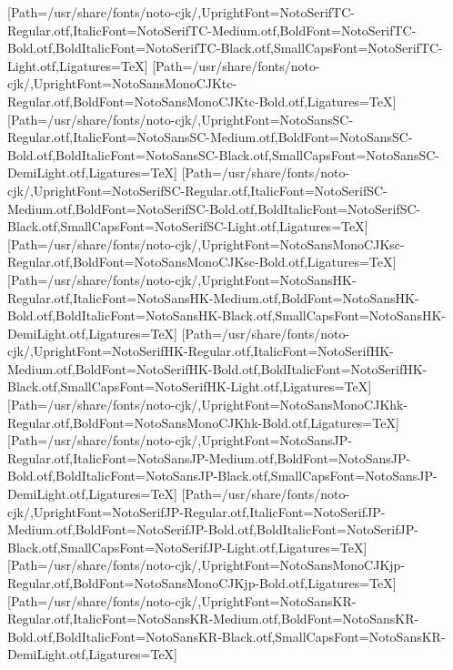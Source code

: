 \newfontfamily{}[Path=/usr/share/fonts/noto-cjk/,UprightFont=NotoSerifTC-Regular.otf,ItalicFont=NotoSerifTC-Medium.otf,BoldFont=NotoSerifTC-Bold.otf,BoldItalicFont=NotoSerifTC-Black.otf,SmallCapsFont=NotoSerifTC-Light.otf,Ligatures=TeX]
\newfontfamily{}[Path=/usr/share/fonts/noto-cjk/,UprightFont=NotoSansMonoCJKtc-Regular.otf,BoldFont=NotoSansMonoCJKtc-Bold.otf,Ligatures=TeX]
\newfontfamily{}[Path=/usr/share/fonts/noto-cjk/,UprightFont=NotoSansSC-Regular.otf,ItalicFont=NotoSansSC-Medium.otf,BoldFont=NotoSansSC-Bold.otf,BoldItalicFont=NotoSansSC-Black.otf,SmallCapsFont=NotoSansSC-DemiLight.otf,Ligatures=TeX]
\newfontfamily{}[Path=/usr/share/fonts/noto-cjk/,UprightFont=NotoSerifSC-Regular.otf,ItalicFont=NotoSerifSC-Medium.otf,BoldFont=NotoSerifSC-Bold.otf,BoldItalicFont=NotoSerifSC-Black.otf,SmallCapsFont=NotoSerifSC-Light.otf,Ligatures=TeX]
\newfontfamily{}[Path=/usr/share/fonts/noto-cjk/,UprightFont=NotoSansMonoCJKsc-Regular.otf,BoldFont=NotoSansMonoCJKsc-Bold.otf,Ligatures=TeX]
\newfontfamily{}[Path=/usr/share/fonts/noto-cjk/,UprightFont=NotoSansHK-Regular.otf,ItalicFont=NotoSansHK-Medium.otf,BoldFont=NotoSansHK-Bold.otf,BoldItalicFont=NotoSansHK-Black.otf,SmallCapsFont=NotoSansHK-DemiLight.otf,Ligatures=TeX]
\newfontfamily{}[Path=/usr/share/fonts/noto-cjk/,UprightFont=NotoSerifHK-Regular.otf,ItalicFont=NotoSerifHK-Medium.otf,BoldFont=NotoSerifHK-Bold.otf,BoldItalicFont=NotoSerifHK-Black.otf,SmallCapsFont=NotoSerifHK-Light.otf,Ligatures=TeX]
\newfontfamily{}[Path=/usr/share/fonts/noto-cjk/,UprightFont=NotoSansMonoCJKhk-Regular.otf,BoldFont=NotoSansMonoCJKhk-Bold.otf,Ligatures=TeX]
\newfontfamily{}[Path=/usr/share/fonts/noto-cjk/,UprightFont=NotoSansJP-Regular.otf,ItalicFont=NotoSansJP-Medium.otf,BoldFont=NotoSansJP-Bold.otf,BoldItalicFont=NotoSansJP-Black.otf,SmallCapsFont=NotoSansJP-DemiLight.otf,Ligatures=TeX]
\newfontfamily{}[Path=/usr/share/fonts/noto-cjk/,UprightFont=NotoSerifJP-Regular.otf,ItalicFont=NotoSerifJP-Medium.otf,BoldFont=NotoSerifJP-Bold.otf,BoldItalicFont=NotoSerifJP-Black.otf,SmallCapsFont=NotoSerifJP-Light.otf,Ligatures=TeX]
\newfontfamily{}[Path=/usr/share/fonts/noto-cjk/,UprightFont=NotoSansMonoCJKjp-Regular.otf,BoldFont=NotoSansMonoCJKjp-Bold.otf,Ligatures=TeX]
\newfontfamily{}[Path=/usr/share/fonts/noto-cjk/,UprightFont=NotoSansKR-Regular.otf,ItalicFont=NotoSansKR-Medium.otf,BoldFont=NotoSansKR-Bold.otf,BoldItalicFont=NotoSansKR-Black.otf,SmallCapsFont=NotoSansKR-DemiLight.otf,Ligatures=TeX]
